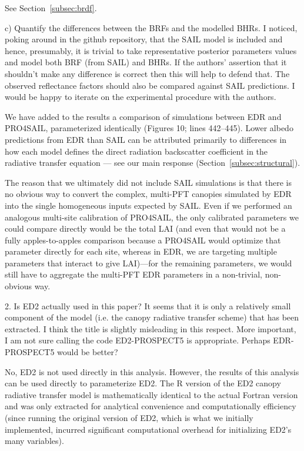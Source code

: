 See Section~\ref{subsec:brdf}.

\begin{reviewer}
  c) Quantify the differences between the BRFs and the modelled BHRs.
  I noticed, poking around in the github repository, that the SAIL model is included and hence, presumably, it is trivial to take representative posterior parameters values and model both BRF (from SAIL) and BHRs.
  If the authors’ assertion that it shouldn’t make any difference is correct then this will help to defend that.
  The observed reflectance factors should also be compared against SAIL predictions.
  I would be happy to iterate on the experimental procedure with the authors.
\end{reviewer}

We have added to the results a comparison of simulations between EDR and PRO4SAIL, parameterized identically (Figures 10; lines 442--445).
Lower albedo predictions from EDR than SAIL can be attributed primarily to differences in how each model defines the direct radiation backscatter coefficient in the radiative transfer equation --- see our main response (Section~\ref{subsec:structural}).

The reason that we ultimately did not include SAIL simulations is that there is no obvious way to convert the complex, multi-PFT canopies simulated by EDR into the single homogeneous inputs expected by SAIL.\@
Even if we performed an analogous multi-site calibration of PRO4SAIL, the only calibrated parameters we could compare directly would be the total LAI
(and even that would not be a fully apples-to-apples comparison because a PRO4SAIL would optimize that parameter directly for each site, whereas in EDR, we are targeting multiple parameters that interact to give LAI)---for the remaining parameters, we would still have to aggregate the multi-PFT EDR parameters in a non-trivial, non-obvious way.

\begin{reviewer}
  2. Is ED2 actually used in this paper? It seems that it is only a relatively small component of the model (i.e. the canopy radiative transfer scheme) that has been extracted. I think the title is slightly misleading in this respect. More important, I am not sure calling the code ED2-PROSPECT5 is appropriate. Perhaps EDR-PROSPECT5 would be better?
\end{reviewer}

No, ED2 is not used directly in this analysis.
However, the results of this analysis can be used directly to parameterize ED2.
The R version of the ED2 canopy radiative transfer model is mathematically identical to the actual Fortran version and was only extracted for analytical convenience and computationally efficiency
(since running the original version of ED2, which is what we initially implemented, incurred significant computational overhead for initializing ED2’s many variables).

